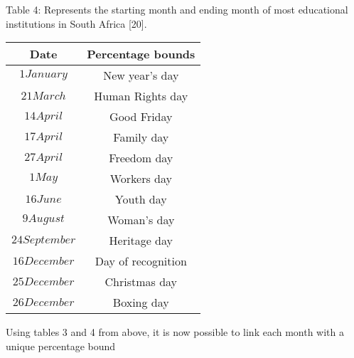 \documentclass{article}
\begin{document}
\begin {center}
Table 4: {Represents the starting month and ending month of most educational institutions in South Africa [20].}

\end {center}
\begin{center}
\begin {tabular}{|c|c|}
\hline

Date& Percentage bounds \\ [0.5ex]
\hline

 $1 January$&New year’s day\\
  $21 March$&Human Rights day\\
   $14 April$&Good Friday\\
    $17 April$&Family day\\
     $27 April$&Freedom day\\
      $1 May$&Workers day\\
       $16 June$&Youth day\\
        $9 August$&Woman’s day\\
         $24 September$&Heritage day\\
          $16 December$&Day of recognition\\
            $25 December$&Christmas day\\
              $26 December$&Boxing day\\
\hline

\end {tabular}

\end {center}
Using tables 3 and 4 from above, it is now possible to link each month with a unique percentage bound
\end{document}
